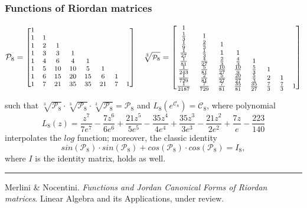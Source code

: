 \documentclass[9pt]{beamer}
\begin{document}
\begin{frame}[fragile]
\frametitle{Functions of Riordan matrices}
\begin{displaymath}
\footnotesize
    \mathcal{P}_{8}=\left[\begin{matrix}1 &   &   &   &   &   &   &  \\1 & 1 &   &   &   &   &   &  \\1 & 2 & 1 &   &   &   &   &  \\1 & 3 & 3 & 1 &   &   &   &  \\1 & 4 & 6 & 4 & 1 &   &   &  \\1 & 5 & 10 & 10 & 5 & 1 &   &  \\1 & 6 & 15 & 20 & 15 & 6 & 1 &  \\1 & 7 & 21 & 35 & 35 & 21 & 7 & 1\end{matrix}\right]
    \quad
    \sqrt[3]{\mathcal{P}_{8}}= \left[\begin{matrix}1 &  &  &  &  &  &  & \\\frac{1}{3} & 1 &  &  &  &  &  & \\\frac{1}{9} & \frac{2}{3} & 1 &  &  &  &  & \\\frac{1}{27} & \frac{1}{3} & 1 & 1 &  &  &  & \\\frac{1}{81} & \frac{4}{27} & \frac{2}{3} & \frac{4}{3} & 1 &  &  & \\\frac{1}{243} & \frac{5}{81} & \frac{10}{27} & \frac{10}{9} & \frac{5}{3} & 1 &  & \\\frac{1}{729} & \frac{2}{81} & \frac{5}{27} & \frac{20}{27} & \frac{5}{3} & 2 & 1 & \\\frac{1}{2187} & \frac{7}{729} & \frac{7}{81} & \frac{35}{81} & \frac{35}{27} & \frac{7}{3} & \frac{7}{3} & 1\end{matrix}\right]
\end{displaymath}

such that %
$\sqrt[3]{\mathcal{P}_8} \cdot \sqrt[3]{\mathcal{P}_8} \cdot
\sqrt[3]{\mathcal{P}_8} =\mathcal{P}_8$ and
$L_{8}\left({e^{\mathcal{C}_{8}}}\right) = \mathcal{C}_{8}$, where polynomial
\begin{displaymath}
{L_{ 8 }}{\left (z \right )} = \frac{z^{7}}{7 e^{7}} - \frac{7 z^{6}}{6 e^{6}} + \frac{21 z^{5}}{5 e^{5}} - \frac{35 z^{4}}{4 e^{4}} + \frac{35 z^{3}}{3 e^{3}} - \frac{21 z^{2}}{2 e^{2}} + \frac{7 z}{e} - \frac{223}{140}
\end{displaymath}
interpolates the $log$ function; moreover, the classic identity 
$$sin(\mathcal{P}_8)\cdot sin(\mathcal{P}_8)+
cos(\mathcal{P}_8)\cdot cos(\mathcal{P}_8)=I_{8},$$ 
where $I$ is the identity matrix, holds as well.
\vfill
\noindent\rule{\textwidth}{0.1pt}
{\footnotesize
Merlini \& Nocentini. \textit{Functions and Jordan Canonical Forms of Riordan
matrices}. \newline Linear Algebra and its Applications, under review.}
\end{frame}
\end{document}
